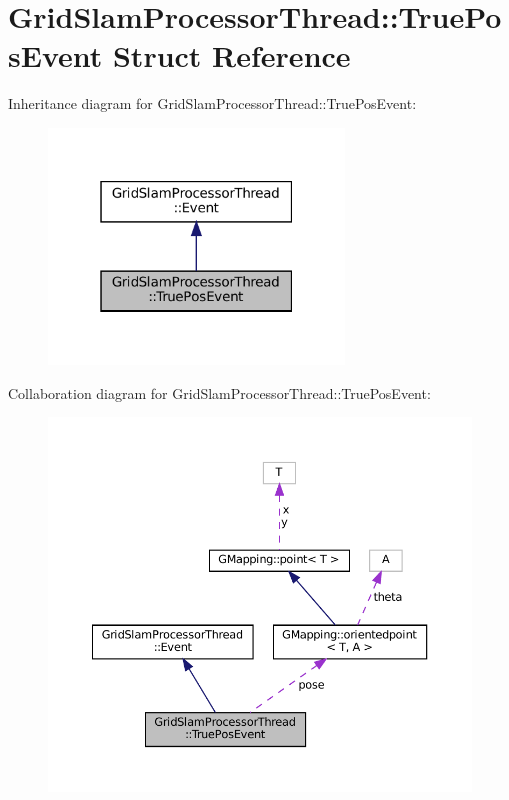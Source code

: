 \hypertarget{structGridSlamProcessorThread_1_1TruePosEvent}{}\section{Grid\+Slam\+Processor\+Thread\+:\+:True\+Pos\+Event Struct Reference}
\label{structGridSlamProcessorThread_1_1TruePosEvent}


Inheritance diagram for Grid\+Slam\+Processor\+Thread\+:\+:True\+Pos\+Event\+:
\nopagebreak
\begin{figure}[H]
\begin{center}
\leavevmode
\includegraphics[width=223pt]{structGridSlamProcessorThread_1_1TruePosEvent__inherit__graph}
\end{center}
\end{figure}


Collaboration diagram for Grid\+Slam\+Processor\+Thread\+:\+:True\+Pos\+Event\+:
\nopagebreak
\begin{figure}[H]
\begin{center}
\leavevmode
\includegraphics[width=350pt]{structGridSlamProcessorThread_1_1TruePosEvent__coll__graph}
\end{center}
\end{figure}
